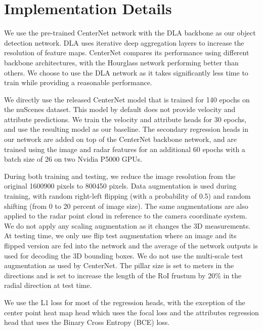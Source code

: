 \documentclass[10pt,twocolumn,letterpaper]{article}
\begin{document}
   
   
   \section{Implementation Details}
   We use the pre-trained CenterNet \cite{zhou2019objects} network with the 
   DLA \cite{yuDeepLayerAggregation2018} backbone as our object detection network. 
   DLA uses iterative deep aggregation layers to increase the resolution 
   of feature maps. CenterNet compares its performance using different backbone 
   architectures, with the Hourglass network \cite{newellHourglass2016a} performing
   better than others. We choose to use the DLA network as it takes significantly less
   time to train while providing a reasonable performance.
   
   We directly use the released CenterNet model that is trained for 140 epochs
   on the nuScenes dataset. This model by default does not 
   provide velocity and attribute predictions. We train the velocity and attribute 
   heads for 30 epochs, and use the resulting model as our baseline. 
   The secondary regression heads in our network are added on top of the CenterNet 
   backbone network, and are trained using
   the image and radar features for an additional 60 epochs with a batch size 
   of 26 on two Nvidia P5000 GPUs. 
   
   During both training and testing, we reduce the image resolution from the original
   1600900 pixels to 800450 pixels. Data augmentation is used 
   during training, with random right-left flipping (with a probability of 0.5) 
   and random shifting (from 0 to 20 percent of image size). The same augmentations
   are also applied to the radar point cloud in reference to the camera coordinate 
   system. We do not apply any scaling augmentation as it changes the 3D
   measurements. At testing time, we only use flip test augmentation where 
   an image and its flipped version are fed into the network and 
   the average of the network outputs is used for decoding the 3D bounding 
   boxes.
   We do not use the multi-scale test augmentation as used by 
   CenterNet. The pillar size is set to   meters in the 
    directions and  is 
   set to increase the length of the RoI frustum by 20\% in the radial direction 
   at test time.
   
   We use the L1 loss for most of the regression heads, with the exception of 
   the center point heat map head which uses the focal loss and the attributes
   regression head that uses the Binary Cross Entropy (BCE) loss.
   
\end{document}
